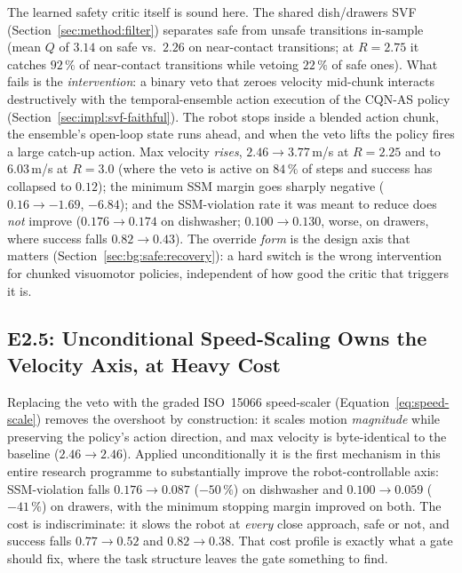 \documentclass[11pt,a4paper]{report}
\newcommand{\ssm}{SSM}
\newcommand{\iso}{ISO~15066}
\newcommand{\cqnas}{CQN-AS}
\begin{document}
The learned safety critic itself is sound here. The shared
dish/drawers SVF (Section~\ref{sec:method:filter}) separates safe
from unsafe transitions in-sample (mean $Q$ of $3.14$ on safe vs.\
$2.26$ on near-contact transitions; at $R = 2.75$ it catches
$92\,\%$ of near-contact transitions while vetoing $22\,\%$ of safe
ones). What fails is the \emph{intervention}: a binary veto that
zeroes velocity mid-chunk interacts destructively with the
temporal-ensemble action execution of the \cqnas{} policy
(Section~\ref{sec:impl:svf-faithful}). The robot stops inside a
blended action chunk, the ensemble's open-loop state runs ahead, and
when the veto lifts the policy fires a large catch-up action.
Max velocity \emph{rises}, $2.46 \to 3.77$\,m/s at $R = 2.25$ and to
$6.03$\,m/s at $R = 3.0$ (where the veto is active on $84\,\%$ of
steps and success has collapsed to $0.12$); the minimum \ssm{} margin
goes sharply negative ($0.16 \to -1.69$, $-6.84$); and the
\ssm{}-violation rate it was meant to reduce does \emph{not} improve
($0.176 \to 0.174$ on dishwasher; $0.100 \to 0.130$, worse, on
drawers, where success falls $0.82 \to 0.43$). The override
\emph{form} is the design axis that matters
(Section~\ref{sec:bg:safe:recovery}): a hard switch is the wrong
intervention for chunked visuomotor policies, independent of how
good the critic that triggers it is.

\subsection{E2.5: Unconditional Speed-Scaling Owns the Velocity Axis, at Heavy Cost}
\label{sec:results:r2-uncond}

Replacing the veto with the graded \iso{} speed-scaler
(Equation~\ref{eq:speed-scale}) removes the overshoot by
construction: it scales motion \emph{magnitude} while preserving the
policy's action direction, and max velocity is byte-identical to the
baseline ($2.46 \to 2.46$). Applied unconditionally it is the first
mechanism in this entire research programme to substantially improve
the robot-controllable axis: \ssm{}-violation falls $0.176 \to 0.087$
($-50\,\%$) on dishwasher and $0.100 \to 0.059$ ($-41\,\%$) on
drawers, with the minimum stopping margin improved on both. The cost
is indiscriminate: it slows the robot at \emph{every} close approach,
safe or not, and success falls $0.77 \to 0.52$ and $0.82 \to 0.38$.
That cost profile is exactly what a gate should fix, where the task
structure leaves the gate something to find.
\end{document}
